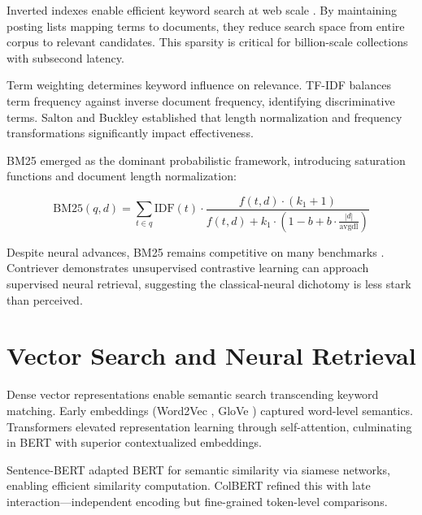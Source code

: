 Inverted indexes enable efficient keyword search at web scale \cite{zobel2006inverted}. By maintaining posting lists mapping terms to documents, they reduce search space from entire corpus to relevant candidates. This sparsity is critical for billion-scale collections with subsecond latency.

Term weighting determines keyword influence on relevance. TF-IDF \cite{sparck1972statistical, salton1975vector} balances term frequency against inverse document frequency, identifying discriminative terms. Salton and Buckley \cite{salton1988term} established that length normalization and frequency transformations significantly impact effectiveness.

BM25 \cite{robertson1994okapi, robertson2009probabilistic} emerged as the dominant probabilistic framework, introducing saturation functions and document length normalization:

\begin{equation}
\text{BM25}(q, d) = \sum_{t \in q} \text{IDF}(t) \cdot \frac{f(t, d) \cdot (k_1 + 1)}{f(t, d) + k_1 \cdot (1 - b + b \cdot \frac{|d|}{\text{avgdl}})}
\end{equation}

Despite neural advances, BM25 remains competitive on many benchmarks \cite{lin2021pretrained}. Contriever \cite{izacard2022unsupervised} demonstrates unsupervised contrastive learning can approach supervised neural retrieval, suggesting the classical-neural dichotomy is less stark than perceived.

\section{Vector Search and Neural Retrieval}

Dense vector representations enable semantic search transcending keyword matching. Early embeddings (Word2Vec \cite{mikolov2013efficient}, GloVe \cite{pennington2014glove}) captured word-level semantics. Transformers \cite{vaswani2017attention} elevated representation learning through self-attention, culminating in BERT \cite{devlin2019bert} with superior contextualized embeddings.

Sentence-BERT \cite{reimers2019sentence} adapted BERT for semantic similarity via siamese networks, enabling efficient similarity computation. ColBERT \cite{khattab2020colbert} refined this with late interaction—independent encoding but fine-grained token-level comparisons.

